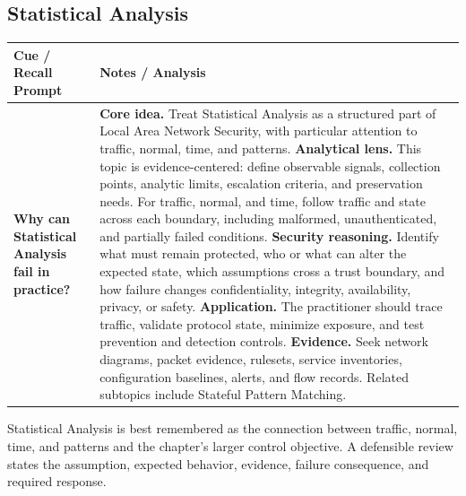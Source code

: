 \documentclass[11pt]{article}
\newcommand{\CornellHeader}{%
\rowcolor{Navy}\color{white}\bfseries Cue / Recall Prompt & \color{white}\bfseries Notes / Analysis\\\hline}
\newcommand{\CornellRow}[2]{%
\cellcolor{CueGray}\RaggedRight\textbf{#1} & \RaggedRight #2\\\hline}
\begin{document}
\subsection*{Statistical Analysis}
\begin{longtable}{>{\RaggedRight\arraybackslash}p{}|>{\RaggedRight\arraybackslash}p{}}
\CornellHeader
\CornellRow{Why can Statistical Analysis fail in practice?}{\textbf{Core idea.} Treat Statistical Analysis as a structured part of Local Area Network Security, with particular attention to traffic, normal, time, and patterns. \textbf{Analytical lens.} This topic is evidence-centered: define observable signals, collection points, analytic limits, escalation criteria, and preservation needs. For traffic, normal, and time, follow traffic and state across each boundary, including malformed, unauthenticated, and partially failed conditions. \textbf{Security reasoning.} Identify what must remain protected, who or what can alter the expected state, which assumptions cross a trust boundary, and how failure changes confidentiality, integrity, availability, privacy, or safety. \textbf{Application.} The practitioner should trace traffic, validate protocol state, minimize exposure, and test prevention and detection controls. \textbf{Evidence.} Seek network diagrams, packet evidence, rulesets, service inventories, configuration baselines, alerts, and flow records. Related subtopics include Stateful Pattern Matching.}
\end{longtable}
\begin{topicsummary}
Statistical Analysis is best remembered as the connection between traffic, normal, time, and patterns and the chapter's larger control objective. A defensible review states the assumption, expected behavior, evidence, failure consequence, and required response.
\end{topicsummary}
\end{document}

